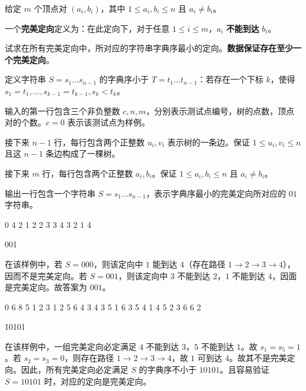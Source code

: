 \documentclass{oicontest-v2}
\begin{document}
给定 $m$ 个顶点对 $(a_i,b_i)$，其中 $1\leq a_i,b_i \leq n$ 且 $a_i\neq b_i$。

一个\textbf{完美定向}定义为：在此定向下，对于任意 $1\leq i\leq m$，$a_i$ \textbf{不能到达} $b_i$。

试求在所有完美定向中，所对应的字符串字典序最小的定向。\textbf{数据保证存在至少一个完美定向}。

定义字符串 $S=s_1\ldots s_{n-1}$ 的字典序小于 $T=t_1\ldots t_{n-1}$：若存在一个下标 $k$，使得 $s_1=t_1,\ldots,s_{k-1}=t_{k-1},s_k<t_k$。

\oicinputformat

输入的第一行包含三个非负整数 $c,n,m$，分别表示测试点编号，树的点数，顶点对的个数。$c=0$ 表示该测试点为样例。

接下来 $n-1$ 行，每行包含两个正整数 $u_i,v_i$ 表示树的一条边。保证 $1\leq u_i,v_i\leq n$ 且这 $n-1$ 条边构成了一棵树。

接下来 $m$ 行，每行包含两个正整数 $a_i,b_i$。保证 $1\leq a_i,b_i \leq n$ 且 $a_i\neq b_i$。

\oicoutputformat

输出一行包含一个字符串 $S=s_1\ldots s_{n-1}$，表示字典序最小的完美定向所对应的 $01$ 字符串。

\begin{oicsample}
0 4 2
1 2
2 3
3 4
3 2
1 4
\end{oicsample}

\begin{oicsample}
001
\end{oicsample}


在该样例中，若 $S=000$，则该定向中 $1$ 能到达 $4$（存在路径 $1\to 2\to 3\to 4$），因而不是完美定向。若 $S=001$，则该定向中 $3$ 不能到达 $2$，$1$ 不能到达 $4$，因面是完美定向。故答案为 $001$。

\begin{oicsample}
0 6 8
5 1
2 3
1 2
5 6
4 3
4 3
5 1
6 3
5 4
1 4
5 2
3 6
6 2
\end{oicsample}

\begin{oicsample}
10101
\end{oicsample}


在该样例中，一组完美定向必定满足 $4$ 不能到达 $3$，$5$ 不能到达 $1$。故 $s_1=s_5=1$。若 $s_2=s_3=0$，则存在路径 $1\to 2\to 3\to 4$，故 $1$ 可到达 $4$。故其不是完美定向。因此，所有完美定向必定满足 $S$ 的字典序不小于 $10101$。且容易验证 $S=10101$ 时，对应的定向是完美定向。
\end{document}
